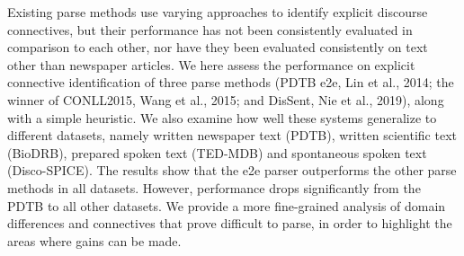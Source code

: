 Existing parse methods use varying approaches to identify explicit discourse connectives, but their performance has not been consistently evaluated in comparison to each other, nor have they been evaluated consistently on text other than newspaper articles. We here assess the performance on explicit connective identification of three parse methods (PDTB e2e, Lin et al., 2014; the winner of CONLL2015, Wang et al., 2015; and DisSent, Nie et al., 2019), along with a simple heuristic. We also examine how well these systems generalize to different datasets, namely written newspaper text (PDTB), written scientific text (BioDRB), prepared spoken text (TED-MDB) and spontaneous spoken text (Disco-SPICE). The results show that the e2e parser outperforms the other parse methods in all datasets. However, performance drops significantly from the PDTB to all other datasets. We provide a more fine-grained analysis of domain differences and connectives that prove difficult to parse, in order to highlight the areas where gains can be made.
